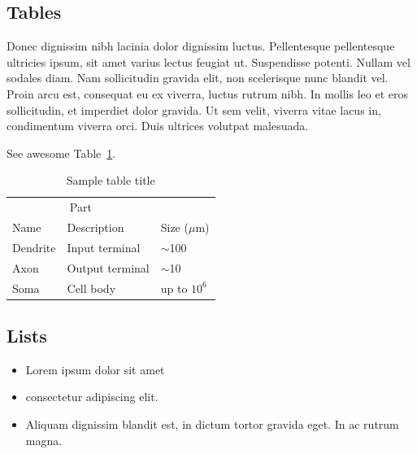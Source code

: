 \documentclass{article}
\begin{document}
\subsection{Tables}
Donec dignissim nibh lacinia dolor dignissim luctus. Pellentesque pellentesque ultricies ipsum, sit amet varius lectus feugiat ut. Suspendisse potenti. Nullam vel sodales diam. Nam sollicitudin gravida elit, non scelerisque nunc blandit vel. Proin arcu est, consequat eu ex viverra, luctus rutrum nibh. In mollis leo et eros sollicitudin, et imperdiet dolor gravida. Ut sem velit, viverra vitae lacus in, condimentum viverra orci. Duis ultrices volutpat malesuada. 


See awesome Table~\ref{tab:table}.

\begin{table}
 \caption{Sample table title}
  \centering
  \begin{tabular}{lll}
    \toprule
    \multicolumn{2}{c}{Part}                   \\
    \cmidrule(r){1-2}
    Name     & Description     & Size ($\mu$m) \\
    \midrule
    Dendrite & Input terminal  & $\sim$100     \\
    Axon     & Output terminal & $\sim$10      \\
    Soma     & Cell body       & up to $10^6$  \\
    \bottomrule
  \end{tabular}
  \label{tab:table}
\end{table}

\subsection{Lists}
\begin{itemize}
\item Lorem ipsum dolor sit amet
\item consectetur adipiscing elit. 
\item Aliquam dignissim blandit est, in dictum tortor gravida eget. In ac rutrum magna.
\end{itemize}


  
\end{document}
